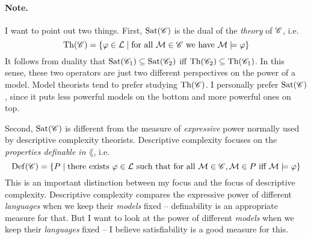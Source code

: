 \documentclass[letterpaper]{article}
\begin{document}
\paragraph*{Note.}  I want to point out two things.  First, $\mathrm{Sat}( \mathscr{C} )$ is the dual of the \emph{theory} of $\mathscr{C}$, i.e.
\[
    \mathrm{Th}( \mathscr{C} ) = \{ \varphi \in \mathcal{L} \mid \textrm{for all } \mathcal{M} \in \mathscr{C} \textrm{ we have } \mathcal{M} \models \varphi \}
\]
It follows from duality that $\mathrm{Sat}( \mathscr{C}_1 ) \subseteq \mathrm{Sat}( \mathscr{C}_2 )$ iff $\mathrm{Th}( \mathscr{C}_2 ) \subseteq \mathrm{Th}( \mathscr{C}_1 )$.  In this sense, these two operators are just two different perspectives on the power of a model.  Model theorists tend to prefer studying $\mathrm{Th}( \mathscr{C} )$.  I personally prefer $\mathrm{Sat}( \mathscr{C} )$, since it puts less powerful models on the bottom and more powerful ones on top.

Second, $\mathrm{Sat}( \mathscr{C} )$ is different from the measure of \emph{expressive} power normally used by descriptive complexity theorists.  Descriptive complexity focuses on the \emph{properties definable in $\lang$}, i.e.
\[
    \mathrm{Def}( \mathscr{C} ) = \{ P \mid \textrm{there exists } \varphi \in \mathcal{L} \textrm{ such that for all } \mathcal{M} \in \mathscr{C}, \mathcal{M} \in P \textrm{ iff } \mathcal{M} \models \varphi \}
\]
This is an important distinction between my focus and the focus of descriptive complexity.  Descriptive complexity compares the expressive power of different \emph{languages} when we keep their \emph{models} fixed -- definability is an appropriate measure for that.  But I want to look at the power of different \emph{models} when we keep their \emph{languages} fixed -- I believe satisfiability is a good measure for this.
\end{document}
